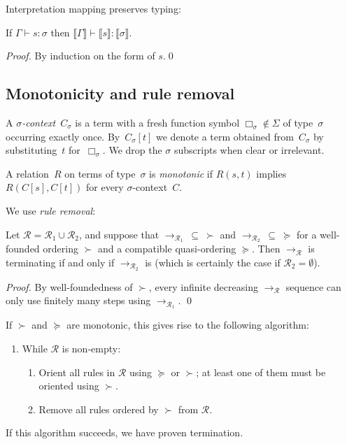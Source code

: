 \documentclass[runningheads,a4paper]{llncs}
\newcommand{\Rules}{\mathcal{R}}
\newcommand{\typeinterpret}[1]{\llbracket #1 \rrbracket}
\newcommand{\interpret}[1]{\llbracket #1 \rrbracket}
\newcommand{\itp}[1]{\llbracket #1 \rrbracket}
\newcommand{\arr}[1]{\longrightarrow_{#1}}
\begin{document}
Interpretation mapping preserves typing:

\begin{lemma}
If $\Gamma \vdash s : \sigma$ then $\itp{\Gamma} \vdash \interpret{s}
: \typeinterpret{\sigma}$.
\end{lemma}

\begin{proof} %
  By induction on the form of $s$.\qed
\end{proof}

\subsection{Monotonicity and rule removal}

\begin{definition}\normalfont
  A \emph{$\sigma$-context}~$C_\sigma$ is a term with a fresh function
  symbol $\Box_\sigma \notin \Sigma$ of type~$\sigma$ occurring
  exactly once. By~$C_\sigma[t]$ we denote a term obtained
  from~$C_\sigma$ by substituting~$t$ for~$\Box_\sigma$. We drop the
  $\sigma$ subscripts when clear or irrelevant.

  A relation~$R$ on terms of type~$\sigma$ is \emph{monotonic} if
  $R(s, t)$ implies $R(C[s], C[t])$ for every $\sigma$-context~$C$.
\end{definition}

We use \emph{rule removal}:

\begin{theorem}\label{thm:ruleremove}
Let $\Rules = \Rules_1 \cup \Rules_2$, and suppose that
$\arr{\Rules_1}\: \subseteq\:\succ$ and
$\arr{\Rules_2}\:\subseteq\:\succeq$ for a well-founded ordering
$\succ$ and a compatible quasi-ordering $\succeq$.  Then
$\arr{\Rules}$ is terminating if and only if $\arr{\Rules_2}$ is
(which is certainly the case if $\Rules_2 = \emptyset$).
\end{theorem}

\begin{proof}
By well-foundedness of $\succ$, every infinite decreasing $\arr{\Rules}$
sequence can only use finitely many steps using $\arr{\Rules_1}$.
\qed
\end{proof}

If $\succ$ and $\succeq$ are monotonic, this gives rise to the
following algorithm:
\begin{enumerate}
\item While $\Rules$ is non-empty:
  \begin{enumerate}
  \item Orient all rules in $\Rules$ using $\succeq$ or $\succ$; at least
    one of them must be oriented using $\succ$.
  \item Remove all rules ordered by $\succ$ from $\Rules$.
  \end{enumerate}
\end{enumerate}
If this algorithm succeeds, we have proven termination.
\end{document}
